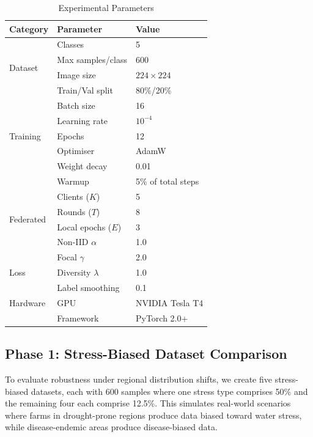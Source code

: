 \documentclass[conference]{IEEEtran}
\begin{document}
\begin{table}[t]
\caption{Experimental Parameters}
\label{tab:expsetup}
\centering\footnotesize
\begin{tabular}{llp{2.6cm}}
\toprule
\textbf{Category} & \textbf{Parameter} & \textbf{Value}\\
\midrule
\multirow{4}{*}{Dataset}
  & Classes          & 5 \\
  & Max samples/class& 600 \\
  & Image size       & $224{\times}224$ \\
  & Train/Val split  & 80\%/20\% \\
\midrule
\multirow{5}{*}{Training}
  & Batch size  & 16 \\
  & Learning rate & $10^{-4}$ \\
  & Epochs      & 12 \\
  & Optimiser   & AdamW \\
  & Weight decay & 0.01 \\
  & Warmup      & 5\% of total steps \\
\midrule
\multirow{4}{*}{Federated}
  & Clients ($K$)   & 5 \\
  & Rounds ($T$)    & 8 \\
  & Local epochs ($E$) & 3 \\
  & Non-IID $\alpha$ & 1.0 \\
\midrule
\multirow{3}{*}{Loss}
  & Focal $\gamma$  & 2.0 \\
  & Diversity $\lambda$ & 1.0 \\
  & Label smoothing & 0.1 \\
\midrule
Hardware
  & GPU       & NVIDIA Tesla T4 \\
  & Framework & PyTorch 2.0+ \\
\bottomrule
\end{tabular}
\end{table}

\subsection{Phase 1: Stress-Biased Dataset Comparison}

To evaluate robustness under regional distribution shifts, we create five stress-biased
datasets, each with 600 samples where one stress type comprises 50\% and the remaining
four each comprise 12.5\%. This simulates real-world scenarios where farms in
drought-prone regions produce data biased toward water stress, while disease-endemic
areas produce disease-biased data.
\end{document}
